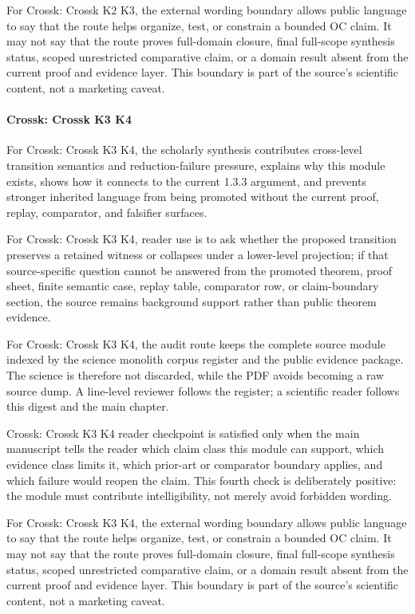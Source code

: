 For Crossk: Crossk K2 K3, the external wording boundary allows public language to say that the route helps organize, test, or constrain a bounded OC claim. It may not say that the route proves full-domain closure, final full-scope synthesis status, scoped unrestricted comparative claim, or a domain result absent from the current proof and evidence layer. This boundary is part of the source's scientific content, not a marketing caveat.


\paragraph{Crossk: Crossk K3 K4}

For Crossk: Crossk K3 K4, the scholarly synthesis contributes cross-level transition semantics and reduction-failure pressure, explains why this module exists, shows how it connects to the current 1.3.3 argument, and prevents stronger inherited language from being promoted without the current proof, replay, comparator, and falsifier surfaces.


For Crossk: Crossk K3 K4, reader use is to ask whether the proposed transition preserves a retained witness or collapses under a lower-level projection; if that source-specific question cannot be answered from the promoted theorem, proof sheet, finite semantic case, replay table, comparator row, or claim-boundary section, the source remains background support rather than public theorem evidence.


For Crossk: Crossk K3 K4, the audit route keeps the complete source module indexed by the science monolith corpus register and the public evidence package. The science is therefore not discarded, while the PDF avoids becoming a raw source dump. A line-level reviewer follows the register; a scientific reader follows this digest and the main chapter.


Crossk: Crossk K3 K4 reader checkpoint is satisfied only when the main manuscript tells the reader which claim class this module can support, which evidence class limits it, which prior-art or comparator boundary applies, and which failure would reopen the claim. This fourth check is deliberately positive: the module must contribute intelligibility, not merely avoid forbidden wording.


For Crossk: Crossk K3 K4, the external wording boundary allows public language to say that the route helps organize, test, or constrain a bounded OC claim. It may not say that the route proves full-domain closure, final full-scope synthesis status, scoped unrestricted comparative claim, or a domain result absent from the current proof and evidence layer. This boundary is part of the source's scientific content, not a marketing caveat.


